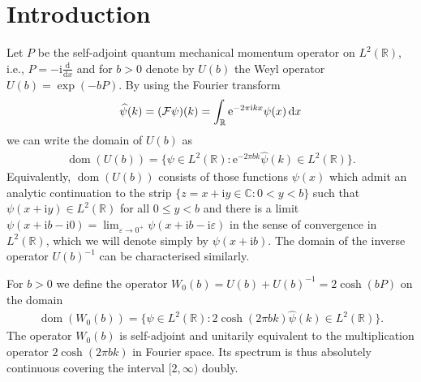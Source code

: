 \documentclass[pdftex]{sigma}%
\numberwithin{equation}{section}
\newcommand{\C}{\mathbb{C}}
\newcommand{\eps}{\varepsilon}
\newcommand{\e}{\mathrm{e}}
\newcommand{\ii}{\mathrm{i}}
\newcommand{\R}{\mathbb{R}}
\DeclareMathOperator{\dom}{dom}
\begin{document}
\renewcommand{\thefootnote}{\arabic{footnote}}
\setcounter{footnote}{0}

\section{Introduction}

Let $P$ be the self-adjoint quantum mechanical momentum operator on $L^2(\R)$, i.e., $P=-\ii\frac{\mathrm{d}}{\mathrm{d}x}$ and for $b>0$ denote by $U(b)$ the Weyl operator $U(b)=\exp(-bP)$. By using the Fourier transform
\begin{gather*}
\widehat{\psi}(k)=(\mathcal{F}\psi)(k)=\int_{\R}\e^{-2\pi\ii kx}\psi(x)\,{\rm d} x
\end{gather*}
we can write the domain of $U(b)$ as
\begin{gather*}
\dom(U(b))=\big\{\psi\in L^2(\R)\colon \e^{-2\pi b k}\widehat{\psi}(k)\in L^2(\R)\big\}.
\end{gather*}
Equivalently, $\dom(U(b))$ consists of those functions $\psi(x)$ which admit an analytic continuation to the strip $\{z = x+\ii y\in\C\colon 0<y <b\}$ such that $\psi(x +\ii y) \in L^2(\R)$ for all $0\leq y < b$ and there is a limit $\psi(x +\ii b - \ii 0) = \lim_{\eps\to 0^+}\psi (x + \ii b - \ii\eps)$ in the sense of convergence in $L^2(\R)$, which we will denote simply by $\psi(x+\ii b)$. The domain of the inverse operator $U(b)^{-1}$ can be characterised similarly.

For $b>0$ we define the operator $W_0(b)=U(b)+U(b)^{-1}=2\cosh(bP)$ on the domain
\begin{gather*}
\dom(W_0(b))=\big\{\psi\in L^2(\R)\colon 2\cosh(2\pi bk)\widehat{\psi}(k)\in L^2(\R)\big\}.
\end{gather*}
The operator $W_0(b)$ is self-adjoint and unitarily equivalent to the multiplication operator \linebreak $2\cosh(2\pi b k)$ in Fourier space. Its spectrum is thus absolutely continuous covering the interval
$[2,\infty)$ doubly.
\end{document}
